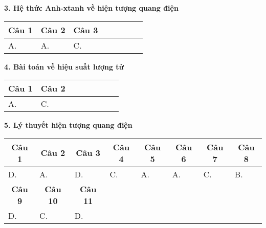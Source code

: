 \textbf{3. Hệ thức Anh-xtanh về hiện tượng quang điện}

\begin{longtable}[\textwidth]{|p{}|p{}|p{}|p{}|p{}|p{}|p{}|p{}|}
	\hline%
	\multicolumn{1}{|c|}{\textbf{Câu 1}} & \multicolumn{1}{c|}{\textbf{Câu 2}} & \multicolumn{1}{c|}{\textbf{Câu 3}} &
	\multicolumn{1}{c|}{\textbf{}} &
	\multicolumn{1}{c|}{\textbf{}} &
	\multicolumn{1}{c|}{\textbf{}} &
	\multicolumn{1}{c|}{\textbf{}} &
	\multicolumn{1}{c|}{\textbf{}}\\
	\hline
	A. &A. &C. & & & & & \\
	\hline
\end{longtable}	


\textbf{4. Bài toán về hiệu suất lượng tử}
\begin{longtable}[\textwidth]{|p{}|p{}|p{}|p{}|p{}|p{}|p{}|p{}|}
	\hline%
	\multicolumn{1}{|c}{\textbf{Câu 1}} & \multicolumn{1}{|c|}{\textbf{Câu 2}} & \multicolumn{1}{c|}{\textbf{}} &
	\multicolumn{1}{c|}{\textbf{}} &
	\multicolumn{1}{c|}{\textbf{}} &
	\multicolumn{1}{c|}{\textbf{}} &
	\multicolumn{1}{c|}{\textbf{}} &
	\multicolumn{1}{c|}{\textbf{}}\\
	\hline
	A. &C. & & & & & & \\
	\hline
\end{longtable}	


\textbf{5. Lý thuyết hiện tượng quang điện}

\begin{longtable}[\textwidth]{|p{}|p{}|p{}|p{}|p{}|p{}|p{}|p{}|}
	\hline%
	\multicolumn{1}{|c}{\textbf{Câu 1}} & \multicolumn{1}{|c|}{\textbf{Câu 2}} & \multicolumn{1}{c|}{\textbf{Câu 3}} &
	\multicolumn{1}{c|}{\textbf{Câu 4}} &
	\multicolumn{1}{c|}{\textbf{Câu 5}} &
	\multicolumn{1}{c|}{\textbf{Câu 6}} &
	\multicolumn{1}{c|}{\textbf{Câu 7}} &
	\multicolumn{1}{c|}{\textbf{Câu 8}}\\
	\hline
	D. &A. &D. &C. &A. &A. &C. &B.\\
	\hline
	
	\multicolumn{1}{|c|}{\textbf{Câu 9}} & \multicolumn{1}{c|}{\textbf{Câu 10}} & \multicolumn{1}{c|}{\textbf{Câu 11}} &
	\multicolumn{1}{c|}{\textbf{}} &
	\multicolumn{1}{c|}{\textbf{}} &
	\multicolumn{1}{c|}{\textbf{}} &
	\multicolumn{1}{c|}{\textbf{}} &
	\multicolumn{1}{c|}{\textbf{}} \\
	\hline
	D. &C. &D. & & & & & \\
	\hline		
\end{longtable}















